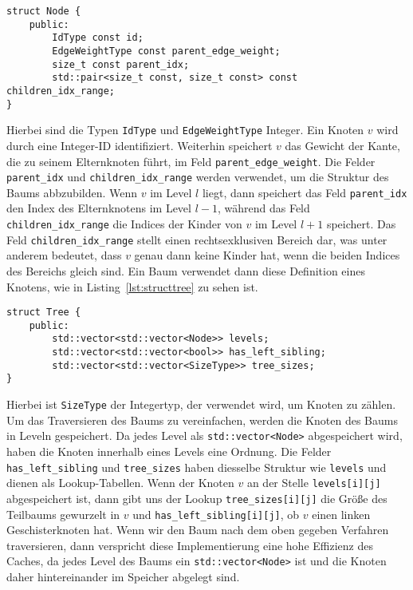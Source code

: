 \begin{lstlisting}[caption={Definition von \texttt{struct Node}}, label={lst:structnode}]
struct Node {
    public:
        IdType const id;
        EdgeWeightType const parent_edge_weight;
        size_t const parent_idx;
        std::pair<size_t const, size_t const> const children_idx_range;
}
\end{lstlisting}

Hierbei sind die Typen \texttt{IdType} und \texttt{EdgeWeightType} Integer.
Ein Knoten $v$ wird durch eine Integer-ID identifiziert. 
Weiterhin speichert $v$ das Gewicht der Kante, die zu seinem Elternknoten führt, im Feld \texttt{parent\_edge\_weight}.
Die Felder \texttt{parent\_idx} und \texttt{children\_idx\_range} werden verwendet, um die Struktur des Baums abbzubilden.
Wenn $v$ im Level $l$ liegt, dann speichert das Feld \texttt{parent\_idx} den Index des Elternknotens im Level $l-1$, während das Feld \texttt{children\_idx\_range} die Indices der Kinder von $v$ im Level $l+1$ speichert.
Das Feld \texttt{children\_idx\_range} stellt einen rechtsexklusiven Bereich dar, was unter anderem bedeutet, dass $v$ genau dann keine Kinder hat, wenn die beiden Indices des Bereichs gleich sind.
Ein Baum verwendet dann diese Definition eines Knotens, wie in Listing~\ref{lst:structtree} zu sehen ist.

\begin{lstlisting}[caption={Definition von \texttt{struct Tree}}, label={lst:structtree}]
struct Tree {
    public:
        std::vector<std::vector<Node>> levels;
        std::vector<std::vector<bool>> has_left_sibling;
        std::vector<std::vector<SizeType>> tree_sizes;
}
\end{lstlisting}
 Hierbei ist \texttt{SizeType} der Integertyp, der verwendet wird, um Knoten zu zählen.
Um das Traversieren des Baums zu vereinfachen, werden die Knoten des Baums in Leveln gespeichert.
Da jedes Level als \texttt{std::vector<Node>} abgespeichert wird, haben die Knoten innerhalb eines Levels eine Ordnung.
Die Felder \texttt{has\_left\_sibling} und \texttt{tree\_sizes} haben diesselbe Struktur wie \texttt{levels} und dienen als Lookup-Tabellen.
Wenn der Knoten $v$ an der Stelle \texttt{levels[i][j]} abgespeichert ist, dann gibt uns der Lookup \texttt{tree\_sizes[i][j]} die Größe des Teilbaums gewurzelt in $v$ und \texttt{has\_left\_sibling[i][j]}, ob $v$ einen linken Geschisterknoten hat.
Wenn wir den Baum nach dem oben gegeben Verfahren traversieren, dann verspricht diese Implementierung eine hohe Effizienz des Caches, da jedes Level des Baums ein \texttt{std::vector<Node>} ist und die Knoten daher hintereinander im Speicher abgelegt sind.

